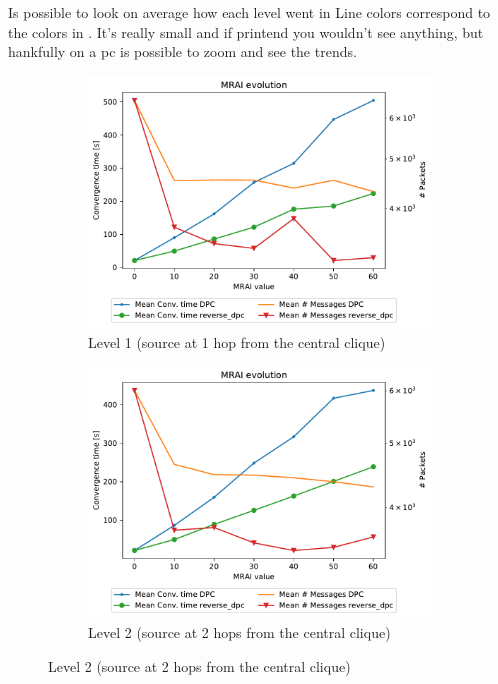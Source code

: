 \documentclass[10pt,conference,letterpaper]{IEEEtran}
\newcommand{\figwidth}{0.78}
\begin{document}
Is possible to look on average how each level went in 
Line colors correspond to the colors in .
It's really small and if printend you wouldn't see anything, but hankfully on a pc
is possible to zoom and see the trends.

\begin{figure}[tb]
	\centering

	\begin{subfigure}{.49\columnwidth}
		\centering
		\includegraphics[width=\figwidth\columnwidth]{images/different_levels/different_levels-1000_hier_1_mean.pdf}
		\caption{Level 1 (source at 1 hop from the central clique)}
		\label{fig:1000-mean-level1}
	\end{subfigure}
	\hfill
	\begin{subfigure}{.49\columnwidth}
		\centering
		\includegraphics[width=\figwidth\columnwidth]{images/different_levels/different_levels-1000_hier_2_mean.pdf}
		\caption{Level 2 (source at 2 hops from the central clique)}
		\label{fig:1000-mean-level2}
	\end{subfigure}


\end{figure}
\end{document}
